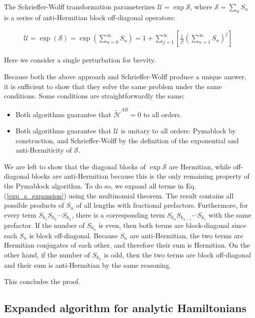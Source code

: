 The Schrieffer-Wolff transformation parameterizes $\mathcal{U} = \exp
\mathcal{S}$, where $\mathcal{S} = \sum_n S_n$ is a series of
anti-Hermitian block off-diagonal operators:

\begin{align}
\label{exp_s_expansion}
\mathcal{U} = \exp{\left(\mathcal{S}\right)}=\exp{\left(\sum_{n=0}^\infty
S_n\right)} = 1+\sum_{j=1}^\infty \left[\frac{1}{j!}
\left(\sum_{n=1}^\infty S_n\right)^j\right]
\end{align}

Here we consider a single perturbation for brevity.

Because both the above approach and Schrieffer-Wolff produce a unique answer, it
is sufficient to show that they solve the same problem under the same
conditions.
Some conditions are straightforwardly the same:

\begin{itemize}
\item Both algorithms guarantee that $\tilde{\mathcal{H}}^{AB} = 0$ to all orders.
\item Both algorithms guarantee that $\mathcal{U}$ is unitary to all orders:
Pymablock by construction, and Schrieffer-Wolff by the
definition of the exponential and anti-Hermiticity of $\mathcal{S}$.
\end{itemize}

We are left to show that the diagonal blocks of $\exp \mathcal{S}$ are
Hermitian, while off-diagonal blocks are anti-Hermitian because this is the
only remaining property of the Pymablock algorithm.
To do so, we expand all terms in Eq. (\ref{exp_s_expansion}) using the multinomial theorem.
The result contains all possible products of $S_n$ of all lengths with fractional prefactors.
Furthermore, for every term $S_{k_1}S_{k_2}\cdots S_{k_n}$, there is a
corresponding term $S_{k_n}S_{k_{n -1}}\cdots S_{k_1}$ with the same prefactor.
If the number of $S_{k_n}$ is even, then both terms are block-diagonal since
each $S_n$ is block off-diagonal.
Because $S_n$ are anti-Hermitian, the two terms are Hermitian conjugates of each
other, and therefore their sum is Hermitian.
On the other hand, if the number of $S_{k_n}$ is odd, then the two terms are
block off-diagonal and their sum is anti-Hermitian by the same reasoning.

This concludes the proof.

\subsection{Expanded algorithm for analytic Hamiltonians}

